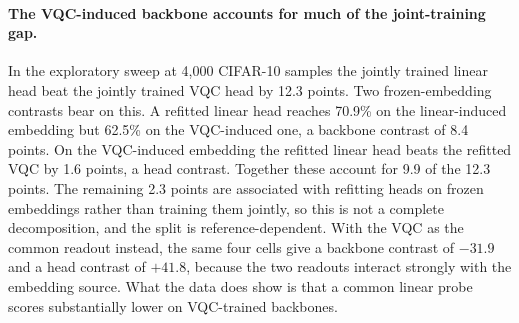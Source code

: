 \documentclass[10pt]{article}
\begin{document}
\paragraph{The VQC-induced backbone accounts for much of the joint-training gap.}
In the exploratory sweep at 4{,}000 CIFAR-10 samples the jointly trained linear
head beat the jointly trained VQC head by 12.3 points. Two frozen-embedding
contrasts bear on this. A refitted linear head reaches 70.9\% on the
linear-induced embedding but 62.5\% on the VQC-induced one, a backbone contrast
of 8.4 points. On the VQC-induced embedding the refitted linear head beats the
refitted VQC by 1.6 points, a head contrast. Together these account for 9.9 of
the 12.3 points. The remaining 2.3 points are associated with refitting heads
on frozen embeddings rather than training them jointly, so this is not a
complete decomposition, and the split is reference-dependent. With the VQC as
the common readout instead, the same four cells give a backbone contrast of
$-31.9$ and a head contrast of $+41.8$, because the two readouts interact
strongly with the embedding source. What the data does show is that a common
linear probe scores substantially lower on VQC-trained backbones.
\end{document}
